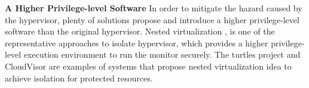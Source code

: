 \documentclass[conference]{IEEEtran}
\begin{document}
\textbf{A Higher Privilege-level Software }
In order to mitigate the hazard caused by the hypervisor, plenty of solutions propose and introduce a higher privilege-level software than the original hypervisor.
Nested virtualization  \cite{Ben2007The}, \cite{Zhang2011CloudVisor} is one of the representative approaches to isolate hypervisor, which provides a higher privilege-level execution environment to run the monitor securely. 
The turtles project \cite{Ben2007The} and CloudVisor \cite{Zhang2011CloudVisor} are examples of systems that propose nested virtualization idea to achieve isolation for protected resources. 

%

\end{document}

